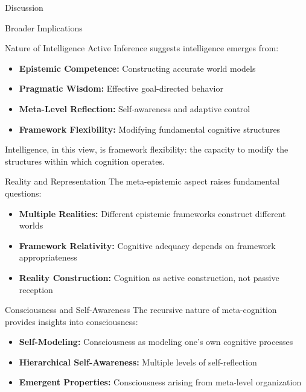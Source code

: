\documentclass[
  ignorenonframetext,
]{beamer}
\providecommand{\tightlist}{%
  \setlength{\itemsep}{0pt}\setlength{\parskip}{0pt}}
\begin{document}
\begin{frame}{Discussion}
\begin{block}{Broader Implications}
\begin{block}{Nature of Intelligence}
\protect{}\label{nature-of-intelligence}
Active Inference suggests intelligence emerges from:

\begin{itemize}
\tightlist
\item
  \textbf{Epistemic Competence:} Constructing accurate world models
\item
  \textbf{Pragmatic Wisdom:} Effective goal-directed behavior
\item
  \textbf{Meta-Level Reflection:} Self-awareness and adaptive control
\item
  \textbf{Framework Flexibility:} Modifying fundamental cognitive
  structures
\end{itemize}

Intelligence, in this view, is framework flexibility: the capacity to
modify the structures within which cognition operates.
\end{block}

\begin{block}{Reality and Representation}
\protect{}\label{reality-and-representation}
The meta-epistemic aspect raises fundamental questions:

\begin{itemize}
\tightlist
\item
  \textbf{Multiple Realities:} Different epistemic frameworks construct
  different worlds
\item
  \textbf{Framework Relativity:} Cognitive adequacy depends on framework
  appropriateness
\item
  \textbf{Reality Construction:} Cognition as active construction, not
  passive reception
\end{itemize}
\end{block}

\begin{block}{Consciousness and Self-Awareness}
\protect{}\label{consciousness-and-self-awareness}
The recursive nature of meta-cognition provides insights into
consciousness:

\begin{itemize}
\tightlist
\item
  \textbf{Self-Modeling:} Consciousness as modeling one's own cognitive
  processes
\item
  \textbf{Hierarchical Self-Awareness:} Multiple levels of
  self-reflection
\item
  \textbf{Emergent Properties:} Consciousness arising from meta-level
  organization
\end{itemize}
\end{block}
\end{block}


\end{frame}
\end{document}
